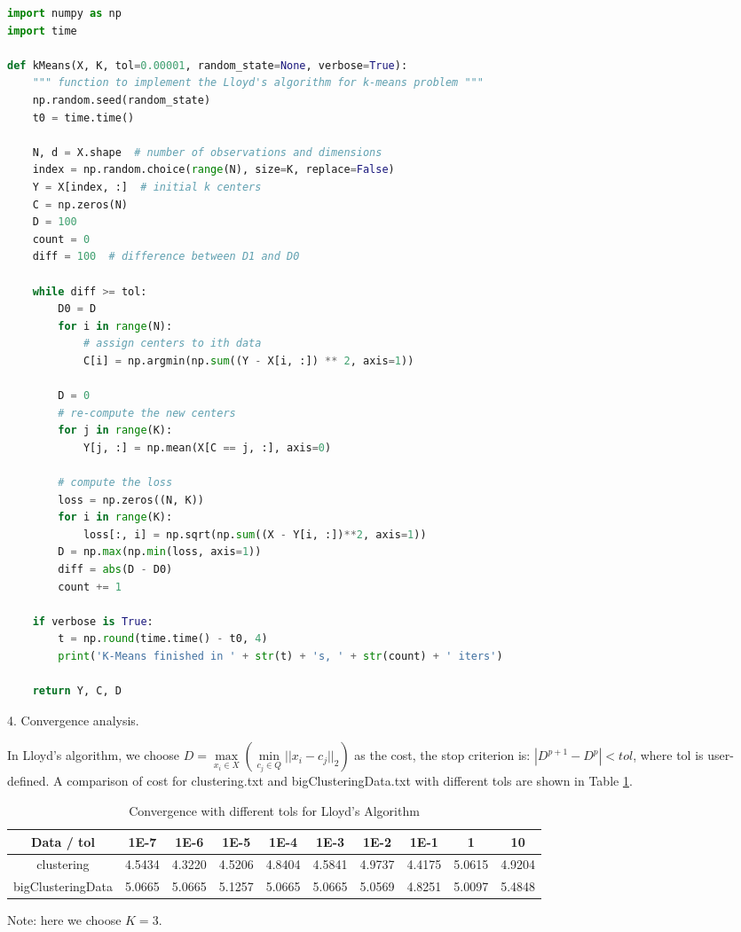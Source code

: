 \begin{description}
\begin{description}
\begin{lstlisting}[language=Python, caption={K-Means Algorithm Python Code}]
import numpy as np
import time

def kMeans(X, K, tol=0.00001, random_state=None, verbose=True):
    """ function to implement the Lloyd's algorithm for k-means problem """
    np.random.seed(random_state)
    t0 = time.time()

    N, d = X.shape  # number of observations and dimensions
    index = np.random.choice(range(N), size=K, replace=False)
    Y = X[index, :]  # initial k centers
    C = np.zeros(N)
    D = 100
    count = 0
    diff = 100  # difference between D1 and D0

    while diff >= tol:
        D0 = D
        for i in range(N):
            # assign centers to ith data
            C[i] = np.argmin(np.sum((Y - X[i, :]) ** 2, axis=1))

        D = 0
        # re-compute the new centers
        for j in range(K):
            Y[j, :] = np.mean(X[C == j, :], axis=0)

        # compute the loss
        loss = np.zeros((N, K))
        for i in range(K):
            loss[:, i] = np.sqrt(np.sum((X - Y[i, :])**2, axis=1))
        D = np.max(np.min(loss, axis=1))
        diff = abs(D - D0)
        count += 1

    if verbose is True:
        t = np.round(time.time() - t0, 4)
        print('K-Means finished in ' + str(t) + 's, ' + str(count) + ' iters')

    return Y, C, D
\end{lstlisting}

\item{4.} Convergence analysis.

In Lloyd's algorithm, we choose $D = \underset{x_i \in X}{\max}( \underset{c_j \in Q}{\min}{||x_i - c_j||_2})$ as the cost, the stop criterion is: $|D^{p+1} - D^{p}| < tol$, where tol is user-defined. A comparison of cost for clustering.txt and bigClusteringData.txt with different tols are shown in Table \ref{table:tol}.

\begin{table}[H]
	\centering
	\caption{Convergence with different tols for Lloyd's Algorithm}
	\label{table:tol}	
	\begin{tabular}{ c | c | c | c | c | c | c | c | c | c}
		\hline \hline
		Data / tol   & 1E-7    & 1E-6    & 1E-5     & 1E-4    & 1E-3    & 1E-2    & 1E-1    & 1    & 10 \\[0.1cm]
		\hline
	clustering	       & 4.5434 & 4.3220    & 4.5206    & 4.8404    & 4.5841    & 4.9737 & 4.4175 & 5.0615 & 4.9204 \\[0.1cm]
bigClusteringData & 5.0665 & 5.0665    & 5.1257    & 5.0665    & 5.0665    & 5.0569 & 4.8251 & 5.0097 & 5.4848 \\[0.1cm]
		\hline	
	\end{tabular}
\end{table}
Note: here we choose $K = 3$.\\


\end{description}
\end{description}
